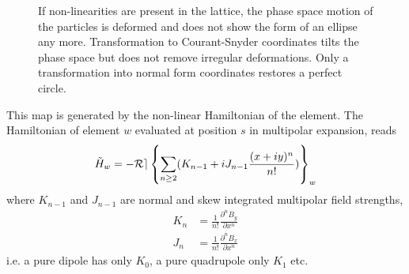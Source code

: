 \begin{figure}[ht]
    \centering
    
    
    
    \caption{
      If non-linearities are present in the lattice, the phase space motion of the particles is
      deformed and does not show the form of an ellipse any more. 
      Transformation to Courant-Snyder
      coordinates tilts the phase space but does not remove irregular deformations.
      Only a transformation into normal form coordinates restores a perfect circle.
    }
    \label{fig_phase_space_ellipse_nl}
\end{figure}

This map is generated by the non-linear Hamiltonian of the element.
The Hamiltonian of element $w$ evaluated at position $s$ in multipolar expansion,
reads
\begin{equation}
  \tilde{H}_w =
  -\mathcal{Re} \left\{ \sum\limits_{n\ge 2} (K_{n-1} + i J_{n-1}\frac{(x+iy)^n}{n!}) \right\}_w
  \label{eq_gen_hamil}
\end{equation}
%
where $K_{n-1}$ and $J_{n-1}$ are normal and skew integrated multipolar field strengths,
%
\begin{align}
  K_n &= \frac{1}{n!}\frac{\partial^n B_y}{\partial x^{n}}\\
  J_n &= \frac{1}{n!}\frac{\partial^n B_x}{\partial x^{n}}
\end{align}
%
i.e. a pure dipole has only $K_0$, a pure quadrupole only $K_1$ etc.

